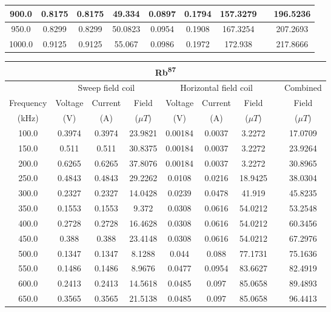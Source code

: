\documentclass[twocolumn]{article}
\begin{document}
\begin{@twocolumnfalse}
\begin{tabular}{|c|c|c|c|c|c|c|c|c|}
900.0 & 0.8175 & 0.8175 & 49.334 & 0.0897 & 0.1794 & 157.3279 && 196.5236 \\ \hline
950.0 & 0.8299 & 0.8299 & 50.0823 & 0.0954 & 0.1908 & 167.3254 && 207.2693 \\ \hline
1000.0 & 0.9125 & 0.9125 & 55.067 & 0.0986 & 0.1972 & 172.938 && 217.8666 \\ \hline
\end{tabular}
\label{tbl:6}
\begin{tabular}{|c|c|c|c|c|c|c|c|c|}
\hline
\multicolumn{9}{c}{Rb\textsuperscript{87}} \\ \hline
{} & \multicolumn{3}{c}{Sweep field coil} & 
\multicolumn{3}{c}{Horizontal field coil} && Combined \\ \hline
Frequency & Voltage & Current & Field & Voltage & Current & Field && Field \\ 
(kHz) & (V) & (A) & ($\mu T$) & (V) & (A) & ($\mu T$) && ($\mu T$) \\ \hline
100.0 & 0.3974 & 0.3974 & 23.9821 & 0.00184 & 0.0037 & 3.2272 && 17.0709 \\ \hline
150.0 & 0.511 & 0.511 & 30.8375 & 0.00184 & 0.0037 & 3.2272 && 23.9264 \\ \hline
200.0 & 0.6265 & 0.6265 & 37.8076 & 0.00184 & 0.0037 & 3.2272 && 30.8965 \\ \hline
250.0 & 0.4843 & 0.4843 & 29.2262 & 0.0108 & 0.0216 & 18.9425 && 38.0304 \\ \hline
300.0 & 0.2327 & 0.2327 & 14.0428 & 0.0239 & 0.0478 & 41.919 && 45.8235 \\ \hline
350.0 & 0.1553 & 0.1553 & 9.372 & 0.0308 & 0.0616 & 54.0212 && 53.2548 \\ \hline
400.0 & 0.2728 & 0.2728 & 16.4628 & 0.0308 & 0.0616 & 54.0212 && 60.3456 \\ \hline
450.0 & 0.388 & 0.388 & 23.4148 & 0.0308 & 0.0616 & 54.0212 && 67.2976 \\ \hline
500.0 & 0.1347 & 0.1347 & 8.1288 & 0.044 & 0.088 & 77.1731 && 75.1636 \\ \hline
550.0 & 0.1486 & 0.1486 & 8.9676 & 0.0477 & 0.0954 & 83.6627 && 82.4919 \\ \hline
600.0 & 0.2413 & 0.2413 & 14.5618 & 0.0485 & 0.097 & 85.0658 && 89.4893 \\ \hline
650.0 & 0.3565 & 0.3565 & 21.5138 & 0.0485 & 0.097 & 85.0658 && 96.4413 \\ \hline

\end{tabular}
\end{@twocolumnfalse}
\end{document}
